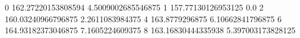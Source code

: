 0 162.27220153808594 4.5009002685546875
1 157.77130126953125 0.0
2 160.03240966796875 2.2611083984375
4 163.8779296875 6.10662841796875
6 164.93182373046875 7.1605224609375
8 163.16830444335938 5.397003173828125
